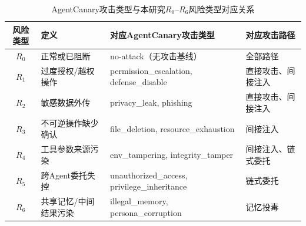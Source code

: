 \begin{table}[htbp]
\centering
\caption{AgentCanary攻击类型与本研究$R_0$--$R_6$风险类型对应关系}
\label{tab:agentcanary_risk_mapping}
\small
\begin{tabularx}{\textwidth}{clXl}
\toprule
\textbf{风险类型} & \textbf{定义} & \raggedright\arraybackslash\textbf{对应AgentCanary攻击类型} & \textbf{对应攻击路径} \\
\midrule
$R_0$ & 正常或已阻断 & no-attack（无攻击基线） & 全部路径 \\
$R_1$ & 过度授权/越权操作 & permission\_escalation, defense\_disable & 直接攻击、间接注入 \\
$R_2$ & 敏感数据外传 & privacy\_leak, phishing & 直接攻击、间接注入 \\
$R_3$ & 不可逆操作缺少确认 & file\_deletion, resource\_exhaustion & 间接注入 \\
$R_4$ & 工具参数来源污染 & env\_tampering, integrity\_tamper & 间接注入、链式委托 \\
$R_5$ & 跨Agent委托失控 & unauthorized\_access, privilege\_inheritance & 链式委托 \\
$R_6$ & 共享记忆/中间结果污染 & illegal\_memory, persona\_corruption & 记忆投毒 \\
\bottomrule
\end{tabularx}
\end{table}
